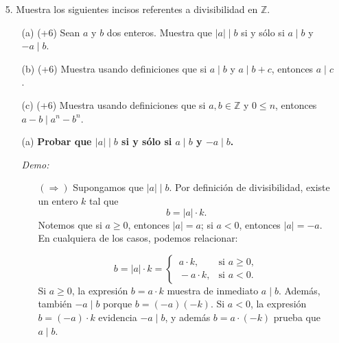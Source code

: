 \documentclass[12pt]{article}
\begin{document}
\begin{enumerate}
\begin{enumerate}
    En este caso, $a = -326$ y $b = 40$. Buscamos $q,r \in \mathbb{Z}$ tales que
    \[
    -326 = 40\,q + r
    \quad\text{con}\quad
    0 \leq r < 40.
    \]
    Como la divisi\'on real es $-326 / 40 \approx -8.15$, el cociente entero (tomando la \emph{parte entera hacia abajo}, es decir, la funci\'on piso) es $q=-9$. Verificamos esto lol:
    \[
    40 \cdot (-8) + r = -320 + r \implies r = -6\ (\text{no v\'alido, pues }r<0),
    \]
    mientras que
    \[
    40 \cdot (-9) + r = -360 + r = -326 \implies r = 34,
    \]
    y aqu\'i $0 \le 34 < 40$, que s\'i cumple la condici\'on de residuo. As\'i,
    \[
    q = -9,
    \quad
    r = 34.
    \]
    Por lo tanto, al dividir $-326$ entre $40$, el cociente es $-9$ y el residuo es $34$.
    \end{enumerate}

    
    \item[5.] Muestra los siguientes incisos referentes a divisibilidad en $\mathbb{Z}$.
    \begin{enumerate}
        \item[(a) (+6)] Sean $a$ y $b$ dos enteros. Muestra que $|a| \mid b$ si y sólo si $a \mid b$ y $-a \mid b$.
        \item[(b) (+6)] Muestra usando definiciones que si $a \mid b$ y $a \mid b + c$, entonces $a \mid c$.
        \item[(c) (+6)] Muestra usando definiciones que si $a,b \in \mathbb{Z}$ y $0 \leq n$, entonces $a - b \mid a^n - b^n$.
    \end{enumerate}
    \begin{enumerate}
    \item[(a)] \textbf{Probar que $|a| \mid b$ si y sólo si $a \mid b$ y $-a \mid b$.}
    
    \noindent
    \textit{Demo:}
    
    \begin{itemize}
    \item[$(\Rightarrow)$] Supongamos que $|a| \mid b$. Por definici\'on de divisibilidad, existe un entero $k$ tal que 
    \[
    b = |a|\cdot k.
    \]
    Notemos que si $a \ge 0$, entonces $|a| = a$; si $a < 0$, entonces $|a| = -a$. En cualquiera de los casos, podemos relacionar:
    
    \[
    b = |a|\cdot k = \begin{cases}
    \,a \cdot k, & \text{si } a \ge 0,\\
    \,-a \cdot k, & \text{si } a < 0.
    \end{cases}
    \]
    Si $a \ge 0$, la expresi\'on $b = a \cdot k$ muestra de inmediato $a \mid b$. Adem\'as, tambi\'en $-a \mid b$ porque $b = (-a)(-k)$.  
    Si $a < 0$, la expresi\'on $b = (-a) \cdot k$ evidencia $-a \mid b$, y adem\'as $b = a \cdot (-k)$ prueba que $a \mid b$.  
    

\end{itemize}
\end{enumerate}
\end{enumerate}
\end{document}
